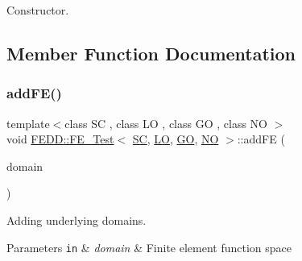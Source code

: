 Constructor. 



\subsection{Member Function Documentation}
\mbox{\label{classFEDD_1_1FE__Test_a9703f9144722f9c01e5bde489c2e6c2f}} 
\subsubsection{\texorpdfstring{add\+F\+E()}{addFE()}}
{\footnotesize\ttfamily template$<$class SC , class LO , class GO , class NO $>$ \\
void \hyperlink{classFEDD_1_1FE__Test}{F\+E\+D\+D\+::\+F\+E\+\_\+\+Test}$<$ \hyperlink{fe__test__laplace_8cpp_a79c7e86a57edbb2a5a53242bcd04e41e}{SC}, \hyperlink{fe__test__laplace_8cpp_ad6a38c9f07d3fd633eefca5bccad8410}{LO}, \hyperlink{fe__test__laplace_8cpp_afa2946b509009b4f45eb04bd8c5b27d9}{GO}, \hyperlink{fe__test__laplace_8cpp_a5e24f37b28787429872b6ecb1d0417ce}{NO} $>$\+::add\+FE (\begin{DoxyParamCaption}\item[{\hyperlink{classFEDD_1_1FE__Test_a0a941851908a1e68d1554f8b28a7c72a}{Domain\+Const\+Ptr\+\_\+\+Type}}]{domain }\end{DoxyParamCaption})}



Adding underlying domains. 


\begin{DoxyParams}[1]{Parameters}
\mbox{\tt in}  & {\em domain} & Finite element function space \\
\hline
\end{DoxyParams}
\mbox{\label{classFEDD_1_1FE__Test_a7a56781f6a535f220c6047a8abf545da}} 

